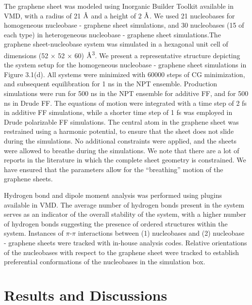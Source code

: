 The graphene sheet was modeled using Inorganic Builder Toolkit available in VMD,\supercite{humphrey_vmd_1996} with a radius of 21 $\text{\normalfont\AA}$ and a height of 2 $\text{\normalfont\AA}$. We used 21 nucleobases for homogeneous nucleobase - graphene sheet simulations, and 30 nucleobases (15 of each type) in heterogeneous nucleobase - graphene sheet simulations.The graphene sheet-nucleobase system was simulated in a hexagonal unit cell of dimensions (52 × 52 × 60) $\text{\normalfont\AA}$\textsuperscript{3}.  We present a representative structure depicting the system setup for the homogeneous nucleobase - graphene sheet simulations in Figure 3.1(d).  All systems were minimized with 60000 steps of CG minimization, and subsequent equilibration for 1 ns in the NPT ensemble. Production simulations were run for 500 ns in the NPT ensemble for additive FF, and for 500 ns in Drude FF. The equations of motion were integrated with a time step of 2 fs in additive FF simulations, while a shorter time step of 1 fs was employed in Drude polarizable FF simulations. The central atom in the graphene sheet was restrained using a harmonic potential, to ensure that the sheet does not slide during the simulations. No additional constraints were applied, and the sheets were allowed to breathe during the simulations. We note that there are a lot of reports in the literature in which the complete sheet geometry is constrained. We have ensured that the parameters allow for the ``breathing'' motion of the graphene sheets. 

Hydrogen bond and dipole moment analysis was performed using plugins available in VMD. The average number of hydrogen bonds present in the system serves as an indicator of the overall stability of the system, with a higher number of hydrogen bonds suggesting the presence of ordered structures within the system. Instances of $\pi$-$\pi$ interactions between (1) nucleobases and (2) nucleobase - graphene sheets were tracked with in-house analysis codes. Relative orientations of the nucleobases with respect to the graphene sheet were tracked to establish preferential conformations of the nucleobases in the simulation box.

\section{Results and Discussions}
